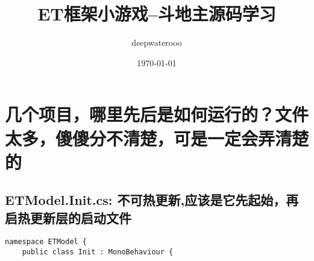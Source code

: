 \documentclass[9pt, b5paper]{article}
\author{deepwaterooo}
\date{\today}
\title{ET框架小游戏--斗地主源码学习}
\begin{document}
\maketitle
\tableofcontents


\section{几个项目，哪里先后是如何运行的？文件太多，傻傻分不清楚，可是一定会弄清楚的}
\label{sec-1}
\subsection{ETModel.Init.cs: 不可热更新,应该是它先起始，再启热更新层的启动文件}
\label{sec-1-1}
\begin{verbatim}
namespace ETModel {
    public class Init : MonoBehaviour {


\end{verbatim}
\end{document}
